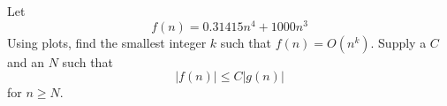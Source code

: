 Let
\[
f(n) = 0.31415 n^{4} + 1000n^3 
\]
Using plots, find the smallest integer $k$ such that $f(n) = O(n^k)$.
Supply a $C$ and an $N$ such that 
\[
|f(n)| \leq C |g(n)|
\]
for $n \geq N$.

